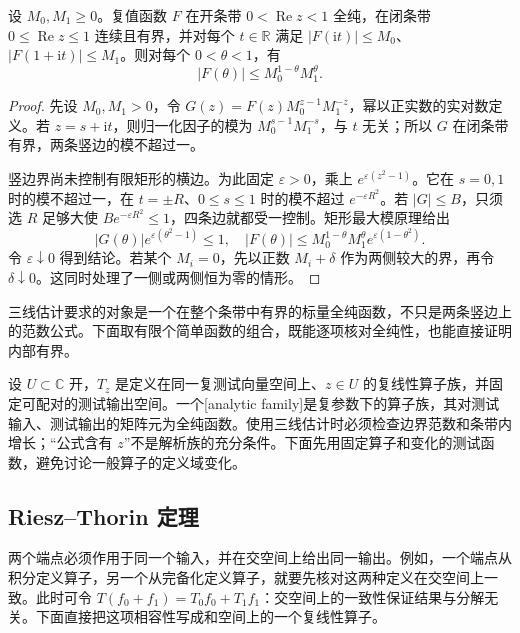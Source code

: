 \begin{lemma}\label{b2:thm:17-three-lines}
设 \(M_0,M_1\geq0\)。复值函数 \(F\) 在开条带 \(0<\operatorname{Re}z<1\) 全纯，在闭条带 \(0\leq\operatorname{Re}z\leq1\) 连续且有界，并对每个 \(t\in\mathbb R\) 满足 \( |F(\mathrm it)|\leq M_0\)、\( |F(1+\mathrm it)|\leq M_1\)。则对每个 \(0<\theta<1\)，有
\[
 |F(\theta)|\leq M_0^{1-\theta}M_1^\theta.
\]
\end{lemma}
\begin{proof}
先设 \(M_0,M_1>0\)，令 \(G(z)=F(z)M_0^{z-1}M_1^{-z}\)，幂以正实数的实对数定义。若 \(z=s+\mathrm it\)，则归一化因子的模为 \(M_0^{s-1}M_1^{-s}\)，与 \(t\) 无关；所以 \(G\) 在闭条带有界，两条竖边的模不超过一。

竖边界尚未控制有限矩形的横边。为此固定 \(\varepsilon>0\)，乘上 \(e^{\varepsilon(z^2-1)}\)。它在 \(s=0,1\) 时的模不超过一，在 \(t=\pm R\)、\(0\leq s\leq1\) 时的模不超过 \(e^{-\varepsilon R^2}\)。若 \(|G|\leq B\)，只须选 \(R\) 足够大使 \(B e^{-\varepsilon R^2}\leq1\)，四条边就都受一控制。矩形最大模原理给出
\[
 |G(\theta)|e^{\varepsilon(\theta^2-1)}\leq1,
 \quad
 |F(\theta)|\leq M_0^{1-\theta}M_1^\theta
 e^{\varepsilon(1-\theta^2)}.
\]
令 \(\varepsilon\downarrow0\) 得到结论。若某个 \(M_i=0\)，先以正数 \(M_i+\delta\) 作为两侧较大的界，再令 \(\delta\downarrow0\)。这同时处理了一侧或两侧恒为零的情形。
\end{proof}

三线估计要求的对象是一个在整个条带中有界的标量全纯函数，不只是两条竖边上的范数公式。下面取有限个简单函数的组合，既能逐项核对全纯性，也能直接证明内部有界。

\ProseParagraphBreak

设 \(U\subset\mathbb C\) 开，\(T_z\) 是定义在同一复测试向量空间上、\(z\in U\) 的复线性算子族，并固定可配对的测试输出空间。一个[analytic family]是复参数下的算子族，其对测试输入、测试输出的矩阵元为全纯函数。使用三线估计时必须检查边界范数和条带内增长；“公式含有 \(z\)”不是解析族的充分条件。下面先用固定算子和变化的测试函数，避免讨论一般算子的定义域变化。

\subsection{Riesz–Thorin 定理}
\label{b2:subsec:170402}

两个端点必须作用于同一个输入，并在交空间上给出同一输出。例如，一个端点从积分定义算子，另一个从完备化定义算子，就要先核对这两种定义在交空间上一致。此时可令 \(T(f_0+f_1)=T_0f_0+T_1f_1\)：交空间上的一致性保证结果与分解无关。下面直接把这项相容性写成和空间上的一个复线性算子。

